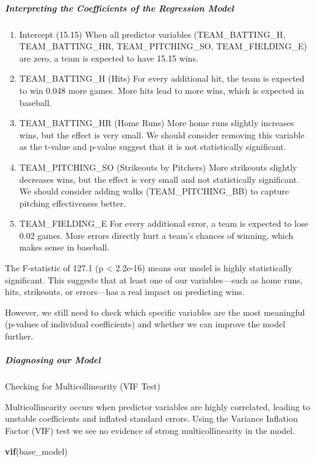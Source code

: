 \documentclass[
]{article}
\newenvironment{Shaded}{\begin{snugshade}}{\end{snugshade}}
\newcommand{\FunctionTok}[1]{\textcolor[rgb]{0.13,0.29,0.53}{\textbf{#1}}}
\newcommand{\NormalTok}[1]{#1}
\begin{document}
\subparagraph{Interpreting the Coefficients of the Regression
Model}\label{interpreting-the-coefficients-of-the-regression-model}

\begin{enumerate}
\def\labelenumi{\arabic{enumi}.}
\item
  Intercept (15.15) When all predictor variables (TEAM\_BATTING\_H,
  TEAM\_BATTING\_HR, TEAM\_PITCHING\_SO, TEAM\_FIELDING\_E) are zero, a
  team is expected to have 15.15 wins.
\item
  TEAM\_BATTING\_H (Hits) For every additional hit, the team is expected
  to win 0.048 more games. More hits lead to more wins, which is
  expected in baseball.
\item
  TEAM\_BATTING\_HR (Home Runs) More home runs slightly increases wins,
  but the effect is very small. We should consider removing this
  variable as the t-value and p-value suggest that it is not
  statistically significant.
\item
  TEAM\_PITCHING\_SO (Strikeouts by Pitchers) More strikeouts slightly
  decreases wins, but the effect is very small and not statistically
  significant. We should consider adding walks (TEAM\_PITCHING\_BB) to
  capture pitching effectiveness better.
\item
  TEAM\_FIELDING\_E For every additional error, a team is expected to
  lose 0.02 games. More errors directly hurt a team's chances of
  winning, which makes sense in baseball.
\end{enumerate}

The F-statistic of 127.1 (p \textless{} 2.2e-16) means our model is
highly statistically significant. This suggests that at least one of our
variables---such as home runs, hits, strikeouts, or errors---has a real
impact on predicting wins.

However, we still need to check which specific variables are the most
meaningful (p-values of individual coefficients) and whether we can
improve the model further.

\subparagraph{Diagnosing our Model}\label{diagnosing-our-model}

Checking for Multicollinearity (VIF Test)

Multicollinearity occurs when predictor variables are highly correlated,
leading to unstable coefficients and inflated standard errors. Using the
Variance Inflation Factor (VIF) test we see no evidence of strong
multicollinearity in the model.

\begin{Shaded}
\begin{Highlighting}[]
\FunctionTok{vif}\NormalTok{(base\_model)}
\end{Highlighting}
\end{Shaded}
\end{document}
